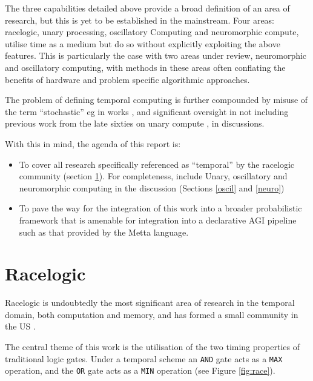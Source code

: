 \documentclass{article}
\begin{document}
The three capabilities detailed above provide a broad definition of an area of research, but this is yet to be established in the mainstream. Four areas: racelogic, unary processing, oscillatory Computing and neuromorphic compute, utilise time as a medium but do so without explicitly exploiting the above features. This is particularly the case with two areas under review, neuromorphic and oscillatory computing, with methods in these areas often conflating the benefits of hardware and problem specific algorithmic approaches.

The problem of defining temporal computing is further compounded by misuse of the term ``stochastic'' eg in works \cite{wu2020ugemm,wu2023power}, and significant oversight in not including previous work from the late sixties on unary compute \cite{POPPELBAUM198747}, in discussions.

With this in mind, the agenda of this report is:
\begin{itemize}
	\item To cover all research specifically referenced as ``temporal'' by the racelogic community (section \ref{race}). For completeness, include Unary, oscillatory and neuromorphic computing in the discussion (Sections \ref{oscil} and \ref{neuro})
	\item To pave the way for the integration of this work into a broader probabilistic framework that is amenable for integration into a declarative AGI pipeline such as that provided by the Metta language.
  	
\end{itemize}


\section{Racelogic} \label{race}
Racelogic is undoubtedly the most significant area of research in the temporal domain, both computation and memory, and has formed a small community in the US \cite{madhavan2014race}.

The central theme of this work is the utilisation of the two timing properties of traditional logic gates. Under a temporal scheme an \texttt{AND} gate acts as a \texttt{MAX} operation, and the \texttt{OR} gate acts as a \texttt{MIN} operation (see Figure \ref{fig:race}).
\end{document}
